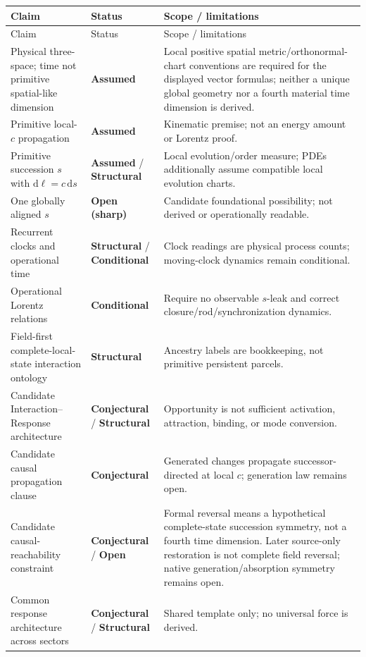 \documentclass[11pt]{article}
\theoremstyle{definition}
\newcommand{\dd}{\mathrm{d}}
\newcommand{\statusStructural}{\textcolor{blue!55!black}{\textbf{Structural}}}
\newcommand{\statusAssumed}{\textcolor{orange!80!black}{\textbf{Assumed}}}
\newcommand{\statusConditional}{\textcolor{yellow!60!black}{\textbf{Conditional}}}
\newcommand{\statusConjectural}{\textcolor{magenta!65!black}{\textbf{Conjectural}}}
\newcommand{\statusOpen}{\textcolor{red!75!black}{\textbf{Open}}}
\newcommand{\statusSharpOpen}{\textcolor{red!35!black}{\textbf{Open (sharp)}}}
\begin{document}
\small
\begin{longtable}{@{}P{4.9cm}P{3.0cm}P{6.8cm}@{}}
\toprule
Claim & Status & Scope / limitations \\
\midrule
\endfirsthead
\toprule
Claim & Status & Scope / limitations \\
\midrule
\endhead
Physical three-space; time not primitive spatial-like dimension & \statusAssumed{} & Local positive spatial metric/orthonormal-chart conventions are required for the displayed vector formulas; neither a unique global geometry nor a fourth material time dimension is derived. \\
Primitive local-$c$ propagation & \statusAssumed{} & Kinematic premise; not an energy amount or Lorentz proof. \\
Primitive succession $s$ with $\dd\ell=c\,\dd s$ & \statusAssumed{} / \statusStructural{} & Local evolution/order measure; PDEs additionally assume compatible local evolution charts. \\
One globally aligned $s$ & \statusSharpOpen{} & Candidate foundational possibility; not derived or operationally readable. \\
Recurrent clocks and operational time & \statusStructural{} / \statusConditional{} & Clock readings are physical process counts; moving-clock dynamics remain conditional. \\
Operational Lorentz relations & \statusConditional{} & Require no observable $s$-leak and correct closure/rod/synchronization dynamics. \\
Field-first complete-local-state interaction ontology & \statusStructural{} & Ancestry labels are bookkeeping, not primitive persistent parcels. \\
Candidate Interaction--Response architecture & \statusConjectural{} / \statusStructural{} & Opportunity is not sufficient activation, attraction, binding, or mode conversion. \\
Candidate causal propagation clause & \statusConjectural{} & Generated changes propagate successor-directed at local $c$; generation law remains open. \\
Candidate causal-reachability constraint
& \statusConjectural{} / \statusOpen{}
& Formal reversal means a hypothetical complete-state succession symmetry, not a fourth time dimension. Later source-only restoration is not complete field reversal; native generation/absorption symmetry remains open. \\
Common response architecture across sectors & \statusConjectural{} / \statusStructural{} & Shared template only; no universal force is derived. \\

\end{longtable}
\end{document}
